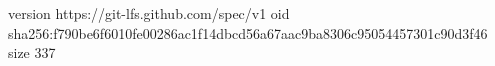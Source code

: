 version https://git-lfs.github.com/spec/v1
oid sha256:f790be6f6010fe00286ac1f14dbcd56a67aac9ba8306c95054457301c90d3f46
size 337

